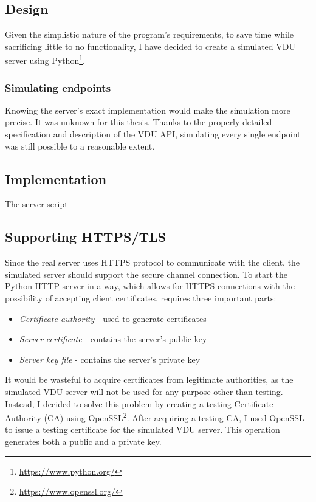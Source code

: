 \subsection{Design}
Given the simplistic nature of the program's requirements, to save time while sacrificing little to no functionality, I have decided to create a simulated VDU server using Python\footnote{\url{https://www.python.org/}}.

\subsubsection{Simulating endpoints}
 Knowing the server's exact implementation would make the simulation more precise. It was unknown for this thesis. Thanks to the properly detailed specification and description of the VDU API, simulating every single endpoint was still possible to a reasonable extent.
 
\subsection{Implementation}
The server script
 
\subsection{Supporting HTTPS/TLS}
Since the real server uses HTTPS protocol to communicate with the client, the simulated server should support the secure channel connection. To start the Python HTTP server in a way, which allows for HTTPS connections with the possibility of accepting client certificates, requires three important parts:
\begin{itemize}
    \item \textit{Certificate authority} - used to generate certificates
    \item \textit{Server certificate} - contains the server's public key
    \item \textit{Server key file} - contains the server's private key
\end{itemize}
It would be wasteful to acquire certificates from legitimate authorities, as the simulated VDU server will not be used for any purpose other than testing. Instead, I decided to solve this problem by creating a testing Certificate Authority (CA) using OpenSSL\footnote{\url{https://www.openssl.org/}}. After acquiring a testing CA, I used OpenSSL to issue a testing certificate for the simulated VDU server. This operation generates both a public and a private key. 

